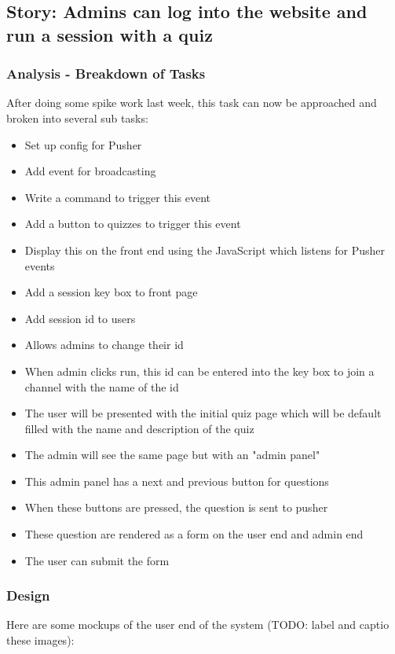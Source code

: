 \subsection{Story: Admins can log into the website and run a session with a quiz}
\subsubsection{Analysis - Breakdown of Tasks}
After doing some spike work last week, this task can now be approached and broken into several sub tasks:
\begin{itemize}
	\item Set up config for Pusher
	\item Add event for broadcasting
	\item Write a command to trigger this event
	\item Add a button to quizzes to trigger this event
	\item Display this on the front end using the JavaScript which listens for Pusher events
	\item Add a session key box to front page
	\item Add session id to users
	\item Allows admins to change their id
	\item When admin clicks run, this id can be entered into the key box to join a channel with the name of the id
	\item The user will be presented with the initial quiz page which will be default filled with the name and description of the quiz
	\item The admin will see the same page but with an "admin panel"
	\item This admin panel has a next and previous button for questions
	\item When these buttons are pressed, the question is sent to pusher
	\item These question are rendered as a form on the user end and admin end
	\item The user can submit the form
\end{itemize}
\subsubsection{Design}
Here are some mockups of the user end of the system (TODO: label and captio these images): 

